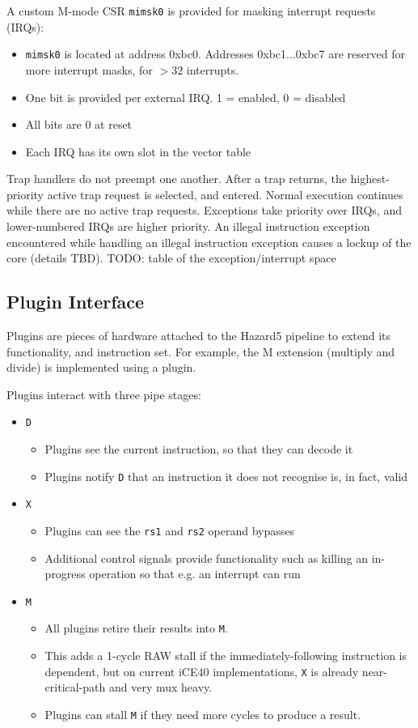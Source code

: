 A custom M-mode CSR {\tt mimsk0} is provided for masking interrupt requests (IRQs):

\begin{itemize}
	\item {\tt mimsk0} is located at address 0xbc0. Addresses 0xbc1...0xbc7 are reserved for more interrupt masks, for $>32$ interrupts.
	\item One bit is provided per external IRQ. 1 = enabled, 0 = disabled
	\item All bits are 0 at reset
	\item Each IRQ has its own slot in the vector table
\end{itemize}

Trap handlers do not preempt one another. After a trap returns, the highest-priority active trap request is selected, and entered. Normal execution continues while there are no active trap requests. Exceptions take priority over IRQs, and lower-numbered IRQs are higher priority. An illegal instruction exception encountered while handling an illegal instruction exception causes a lockup of the core (details TBD). TODO: table of the exception/interrupt space

\subsection{Plugin Interface}

Plugins are pieces of hardware attached to the Hazard5 pipeline to extend its functionality, and instruction set. For example, the M extension (multiply and divide) is implemented using a plugin.

Plugins interact with three pipe stages:

\begin{itemize}
	\item {\tt D}
	\begin{itemize}
		\item Plugins see the current instruction, so that they can decode it
		\item Plugins notify {\tt D} that an instruction it does not recognise is, in fact, valid
	\end{itemize}
	\item {\tt X}
	\begin{itemize}
		\item Plugins can see the {\tt rs1} and {\tt rs2} operand bypasses
		\item Additional control signals provide functionality such as killing an in-progress operation so that e.g. an interrupt can run
	\end{itemize}
	\item {\tt M}
	\begin{itemize}
		\item All plugins retire their results into {\tt M}.
		\item This adds a 1-cycle RAW stall if the immediately-following instruction is dependent, but on current iCE40 implementations, {\tt X} is already near-critical-path and very mux heavy.
		\item Plugins can stall {\tt M} if they need more cycles to produce a result.
	\end{itemize}
\end{itemize}

